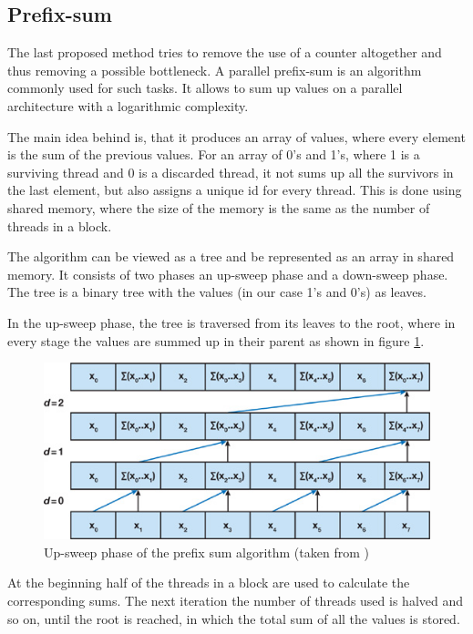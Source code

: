 \subsection{Prefix-sum}\label{sec:impl-prefixsum}

The last proposed method tries to remove the use of a counter altogether and thus removing a possible bottleneck. A parallel prefix-sum is an algorithm commonly used for such tasks. It allows to sum up values on a parallel architecture with a logarithmic complexity.

The main idea behind is, that it produces an array of values, where every element is the sum of the previous values. For an array of 0's and 1's, where 1 is a surviving thread and 0 is a discarded thread, it not sums up all the survivors in the last element, but also assigns a unique id for every thread. This is done using shared memory, where the size of the memory is the same as the number of threads in a block.

The algorithm can be viewed as a tree and be represented as an array in shared memory. It consists of two phases an up-sweep phase and a down-sweep phase. The tree is a binary tree with the values (in our case 1's and 0's) as leaves.

In the up-sweep phase, the tree is traversed from its leaves to the root, where in every stage the values are summed up in their parent as shown in figure \ref{fig:sweepup}.

\begin{center}
\begin{figure}[h]
	\centering\includegraphics[width=0.6\linewidth]{fig/sweepup.jpg}
	\caption{Up-sweep phase of the prefix sum algorithm (taken from \cite{gems-prefixsum})}
	\label{fig:sweepup}
\end{figure}
\end{center}

At the beginning half of the threads in a block are used to calculate the corresponding sums. The next iteration the number of threads used is halved and so on, until the root is reached, in which the total sum of all the values is stored.

